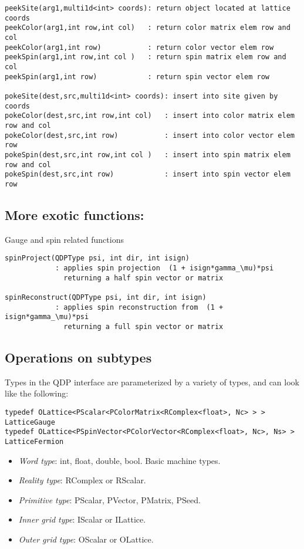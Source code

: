 \documentclass[12pt,letterpaper]{article}
\begin{document}
\begin{verbatim}
peekSite(arg1,multi1d<int> coords): return object located at lattice coords
peekColor(arg1,int row,int col)   : return color matrix elem row and col
peekColor(arg1,int row)           : return color vector elem row
peekSpin(arg1,int row,int col )   : return spin matrix elem row and col
peekSpin(arg1,int row)            : return spin vector elem row

pokeSite(dest,src,multi1d<int> coords): insert into site given by coords
pokeColor(dest,src,int row,int col)   : insert into color matrix elem row and col
pokeColor(dest,src,int row)           : insert into color vector elem row
pokeSpin(dest,src,int row,int col )   : insert into spin matrix elem row and col
pokeSpin(dest,src,int row)            : insert into spin vector elem row
\end{verbatim}


\medskip

\subsection{More exotic functions:}
\label{sec:otherfuncs}

Gauge and spin related functions

\begin{verbatim}
spinProject(QDPType psi, int dir, int isign)
		    : applies spin projection  (1 + isign*gamma_\mu)*psi
		      returning a half spin vector or matrix

spinReconstruct(QDPType psi, int dir, int isign)
		    : applies spin reconstruction from  (1 + isign*gamma_\mu)*psi
		      returning a full spin vector or matrix
\end{verbatim}

\bigskip

\subsection{Operations on subtypes}

Types in the QDP interface are parameterized by a variety of types, and
can look like the following:

\begin{verbatim}
typedef OLattice<PScalar<PColorMatrix<RComplex<float>, Nc> > > LatticeGauge
typedef OLattice<PSpinVector<PColorVector<RComplex<float>, Nc>, Ns> > LatticeFermion
\end{verbatim}

\begin{itemize}
\item {\em Word type}: 
  int, float, double, bool. Basic machine types.
\item {\em Reality type}: 
  RComplex or RScalar. 
\item {\em Primitive type}: 
  PScalar, PVector, PMatrix, PSeed. 
\item {\em Inner grid type}: 
  IScalar or ILattice. 
\item {\em Outer grid type}:
  OScalar or OLattice. 
\end{itemize}
\end{document}
